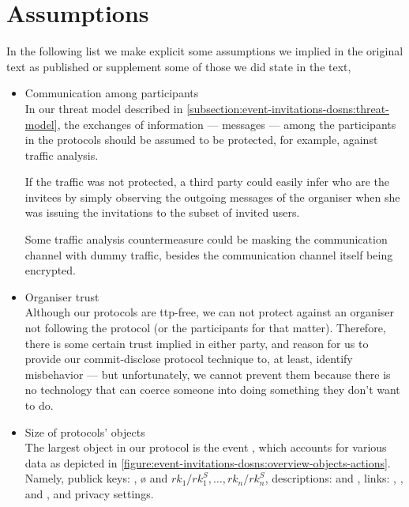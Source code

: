 \section{Assumptions}
    \label{section:thesis:appendix:ei:assumptions}
In the following list we make explicit some assumptions we implied in the original 
text as published or supplement some of those we did state in the text,
\begin{itemize}
    \item Communication among participants\\
    In our threat model described in \cref{subsection:event-invitations-dosns:threat-model}, 
    the exchanges of information --- messages --- among the participants in the 
    protocols should be assumed to be protected, for example, against traffic analysis. 
    
    If the traffic was not protected, a third party could easily infer who are the 
    invitees by simply observing the outgoing messages of the organiser when she 
    was issuing the invitations to the subset of invited users.
    
    Some traffic analysis countermeasure could be masking the communication channel 
    with dummy traffic, besides the communication channel itself being encrypted.

    \item Organiser trust\\
    Although our protocols are \ac{ttp}-free, we can not protect against an organiser 
    not following the protocol (or the participants for that matter). Therefore, there is some 
    certain trust implied in either party, and reason for us to provide our commit-disclose 
    protocol technique to, at least, identify misbehavior --- but unfortunately, 
    we cannot prevent them because there is no technology that can coerce someone 
    into doing something they don't want to do.

    \item Size of protocols' objects\\
    The largest object in our protocol is the event \eo{}, which accounts for various 
    data as depicted in \cref{figure:event-invitations-dosns:overview-objects-actions}. Namely, 
    publick keys: \e{}, \o{} and $rk_1/rk_1^S, \dots, rk_n/rk_n^S$, descriptions: 
    \dP{} and \dS{}, links: \ILL{}, \ILK{}, \CLL{} and \DLL{}, and privacy settings.
    

\end{itemize}
